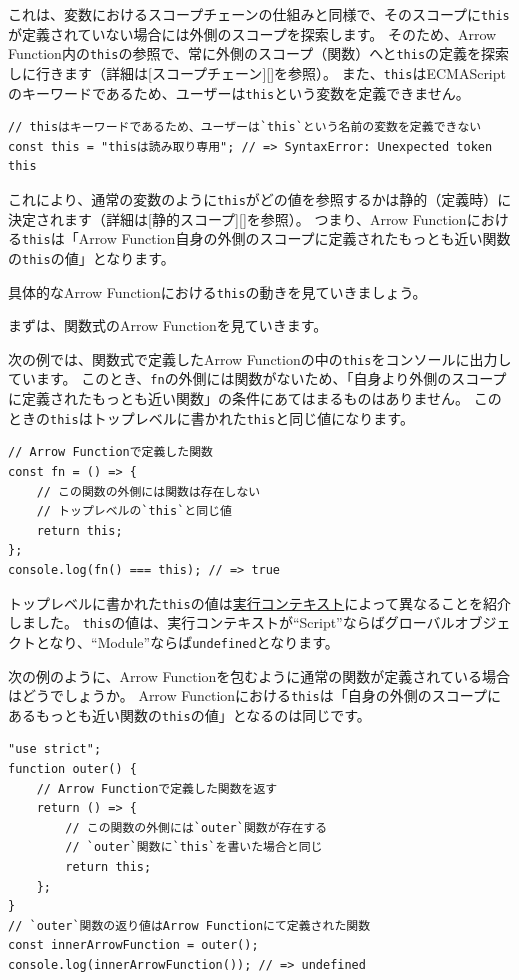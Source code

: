 これは、変数におけるスコープチェーンの仕組みと同様で、そのスコープに\texttt{this}が定義されていない場合には外側のスコープを探索します。
そのため、Arrow
Function内の\texttt{this}の参照で、常に外側のスコープ（関数）へと\texttt{this}の定義を探索しに行きます（詳細は{[}スコープチェーン{]}{[}{]}を参照）。
また、\texttt{this}はECMAScriptのキーワードであるため、ユーザーは\texttt{this}という変数を定義できません。

\begin{lstlisting}
// thisはキーワードであるため、ユーザーは`this`という名前の変数を定義できない
const this = "thisは読み取り専用"; // => SyntaxError: Unexpected token this
\end{lstlisting}

これにより、通常の変数のように\texttt{this}がどの値を参照するかは静的（定義時）に決定されます（詳細は{[}静的スコープ{]}{[}{]}を参照）。
つまり、Arrow Functionにおける\texttt{this}は「Arrow
Function自身の外側のスコープに定義されたもっとも近い関数の\texttt{this}の値」となります。

具体的なArrow
Functionにおける\texttt{this}の動きを見ていきましょう。

まずは、関数式のArrow Functionを見ていきます。

次の例では、関数式で定義したArrow
Functionの中の\texttt{this}をコンソールに出力しています。
このとき、\texttt{fn}の外側には関数がないため、「自身より外側のスコープに定義されたもっとも近い関数」の条件にあてはまるものはありません。
このときの\texttt{this}はトップレベルに書かれた\texttt{this}と同じ値になります。

\begin{lstlisting}
// Arrow Functionで定義した関数
const fn = () => {
    // この関数の外側には関数は存在しない
    // トップレベルの`this`と同じ値
    return this;
};
console.log(fn() === this); // => true
\end{lstlisting}

トップレベルに書かれた\texttt{this}の値は\protect\hyperlink{execution-context-this}{実行コンテキスト}によって異なることを紹介しました。
\texttt{this}の値は、実行コンテキストが``Script''ならばグローバルオブジェクトとなり、``Module''ならば\texttt{undefined}となります。

次の例のように、Arrow
Functionを包むように通常の関数が定義されている場合はどうでしょうか。
Arrow
Functionにおける\texttt{this}は「自身の外側のスコープにあるもっとも近い関数の\texttt{this}の値」となるのは同じです。

\begin{lstlisting}
"use strict";
function outer() {
    // Arrow Functionで定義した関数を返す
    return () => {
        // この関数の外側には`outer`関数が存在する
        // `outer`関数に`this`を書いた場合と同じ
        return this;
    };
}
// `outer`関数の返り値はArrow Functionにて定義された関数
const innerArrowFunction = outer();
console.log(innerArrowFunction()); // => undefined
\end{lstlisting}

